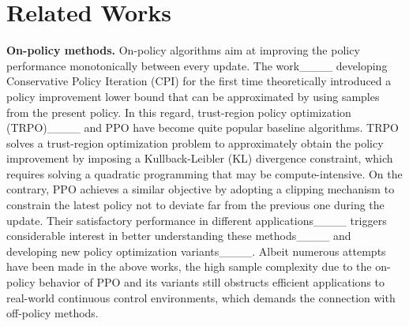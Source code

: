\section{Related Works}
\textbf{On-policy methods.}
On-policy algorithms aim at improving the policy performance monotonically between every update. The work____ developing Conservative Policy Iteration (CPI) for the first time theoretically introduced a policy improvement lower bound that can be approximated by using samples from the present policy. In this regard, trust-region policy optimization (TRPO)____ and PPO have become quite popular baseline algorithms. TRPO solves a trust-region optimization problem to approximately obtain the policy improvement by imposing a Kullback-Leibler (KL) divergence constraint, which
requires solving a quadratic programming that may be compute-intensive. On the contrary, PPO achieves a similar objective by adopting a clipping mechanism to constrain the latest policy not to deviate far from the previous one during the update. Their satisfactory performance in different applications____ triggers considerable interest in better understanding these methods____ and developing new policy optimization variants____.
Albeit numerous attempts have been made in the above works, the high sample complexity due to the on-policy behavior of PPO and its variants still obstructs efficient applications to real-world continuous control environments, which demands the connection with off-policy methods.

